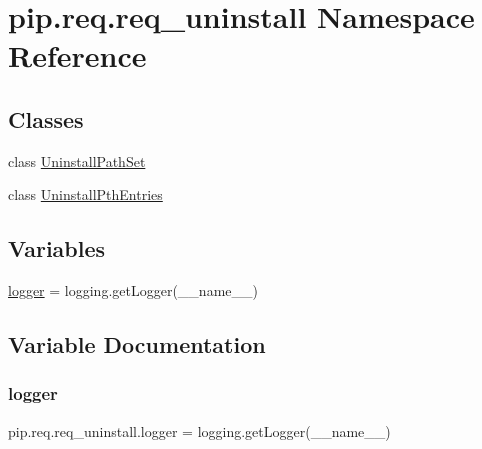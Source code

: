 \hypertarget{namespacepip_1_1req_1_1req__uninstall}{}\section{pip.\+req.\+req\+\_\+uninstall Namespace Reference}
\label{namespacepip_1_1req_1_1req__uninstall}
\subsection*{Classes}
\begin{DoxyCompactItemize}
\item 
class \hyperlink{classpip_1_1req_1_1req__uninstall_1_1_uninstall_path_set}{Uninstall\+Path\+Set}
\item 
class \hyperlink{classpip_1_1req_1_1req__uninstall_1_1_uninstall_pth_entries}{Uninstall\+Pth\+Entries}
\end{DoxyCompactItemize}
\subsection*{Variables}
\begin{DoxyCompactItemize}
\item 
\hyperlink{namespacepip_1_1req_1_1req__uninstall_adef2e5cbe8bbf062bce670ca65218139}{logger} = logging.\+get\+Logger(\+\_\+\+\_\+name\+\_\+\+\_\+)
\end{DoxyCompactItemize}


\subsection{Variable Documentation}
\mbox{\label{namespacepip_1_1req_1_1req__uninstall_adef2e5cbe8bbf062bce670ca65218139}} 
\subsubsection{\texorpdfstring{logger}{logger}}
{\footnotesize\ttfamily pip.\+req.\+req\+\_\+uninstall.\+logger = logging.\+get\+Logger(\+\_\+\+\_\+name\+\_\+\+\_\+)}

